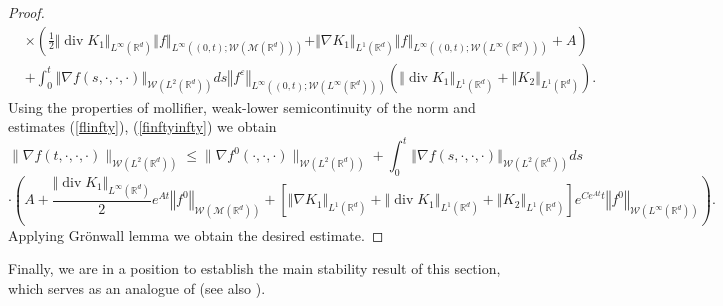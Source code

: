 \documentclass[10pt]{article}
\def\divv{\operatorname {div}}
\newcommand*{\norm}[1]{\left\Vert{#1}\right\Vert}
\newcommand{\ve}{\varepsilon}
\newcommand{\R}{\mathbb{R}}
\newcommand{\W}{\mathcal{W}}
\begin{document}
\begin{proof}
\begin{align*}
  &  \times \left(\frac{1}{2}\Vert \divv K_1\Vert_{L^\infty(\R^d)}\norm{f}_{L^{\infty}((0,t);\W(\mathcal{M}(\R^d)))}
 +\Vert \nabla K_1\Vert_{L^1(\R^d)}\norm{f}_{L^{\infty}((0,t);\W(L^{\infty}(\R^d)))}  +A\right)\\
 & +\int_0^t\norm{\nabla f(s,\cdot,\cdot,\cdot)}_{\W(L^2(\R^d))}ds
\norm{f^\ve}_{L^{\infty}((0,t);\W(L^{\infty}(\R^d)))}\left(\norm{\divv K_1}_{L^{1}(\R^d)} + \norm{ K_2}_{L^{1}(\R^d)}\right).
\end{align*}
Using the properties of mollifier, weak-lower semicontinuity of the norm and estimates (\ref{flinfty}), (\ref{finftyinfty}) we obtain
\[
 \|\nabla f(t,\cdot,\cdot,\cdot)\|_{\W (L^{2}(\R^d))} \leq \|\nabla f^0(\cdot,\cdot,\cdot)\|_{\W (L^{2}(\R^d))}+ \int_0^t \norm{\nabla f(s,\cdot,\cdot,\cdot)}_{\W(L^{2}(\R^d))}ds  
 \]
\[ \cdot\left(A+\frac{\Vert \divv K_1\Vert_{L^\infty(\R^d)}}{2}e^{At}\norm{f^0}_{\W(\mathcal{M}(\R^d))} + \left[\Vert \nabla K_1\Vert_{L^1(\R^d)}+ \norm{\divv K_1}_{L^{1}(\R^d)} + \norm{ K_2}_{L^{1}(\R^d)}\right]e^{Ce^{At}t}\norm{f^0}_{\W(L^{\infty}(\R^d))}\right).
\]
Applying Gr\"onwall lemma we obtain the desired estimate. 

\end{proof}

Finally, we are in a position to establish the main stability result of this section, which serves as an analogue of \cite[Theorem 4.23]{JPS2025} (see also \cite[Lemma 10]{nasza}).
\end{document}
